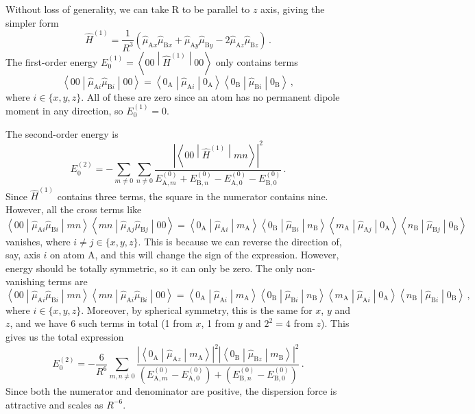 \documentclass{article}
\theoremstyle{plain}\theoremheaderfont{\normalfont\itshape}\theorembodyfont{\rmfamily}\theoremseparator{.}\newtheorem*{rem}{Remark}\newtheorem*{ex}{Example}\newtheorem*{proof}{Proof}\newtheorem*{altp}{Alternative proof}
\theoremstyle{plain}\theoremheaderfont{\normalfont\bfseries}\theorembodyfont{\rmfamily}\theoremseparator{.}\newtheorem{thm}{Theorem}[section]\newtheorem{lem}[thm]{Lemma}\newtheorem{prop}[thm]{Proposition}\newtheorem*{cor}{Corollary}\newtheorem{defn}[thm]{Definition}\newtheorem{clm}[thm]{Claim}\newtheorem{clminproof}{Claim}
\theoremstyle{break}\theoremheaderfont{\normalfont\itshape}\theorembodyfont{\rmfamily}\theoremseparator{.\medskip}\newtheorem*{proofskip}{Proof}\newtheorem*{exs}{Examples}\newtheorem*{rems}{Remarks}
\theoremstyle{break}\theoremheaderfont{\normalfont\bfseries}\theorembodyfont{\rmfamily}\theoremseparator{.\medskip}\newtheorem{lemskip}[thm]{Lemma}\newtheorem{defnskip}[thm]{Definition}\newtheorem{propskip}[thm]{Proposition}\newtheorem{thmskip}[thm]{Theorem}
\numberwithin{equation}{section}
\newcommand{\mel}[3]{\left\langle #1 \middle| #2 \middle| #3 \right\rangle}
\newcommand{\expval}[2]{\left\langle #2 \middle| #1 \middle| #2 \right\rangle}
\newcommand{\vb}[1]{\bm{\mathrm{#1}}}
\newcommand{\abs}[1]{\left| #1 \right|}
\renewcommand{\AA}{\mathrm{A}}
\newcommand{\BB}{\mathrm{B}}
\begin{document}
    Without loss of generality, we can take \(\vb{R}\) to be parallel to \(z\) axis, giving the simpler form
    \begin{equation}
        \hat{H}^{(1)}=\frac{1}{R^3}(\hat{\mu}_{\AA x}\hat{\mu}_{\BB x}+\hat{\mu}_{\AA y}\hat{\mu}_{\BB y}-2\hat{\mu}_{\AA z}\hat{\mu}_{\BB z})\,.
    \end{equation}
    The first-order energy \(E_0^{(1)}=\expval{\hat{H}^{(1)}}{00}\) only contains terms
    \begin{equation}
        \expval{\hat{\mu}_{\AA i}\hat{\mu}_{\BB i}}{00}=\expval{\hat{\mu}_{\AA i}}{0_{\AA}}\expval{\hat{\mu}_{\BB i}}{0_{\BB}}\,,
    \end{equation}
    where \(i\in\{x,y,z\}\). All of these are zero since an atom has no permanent dipole moment in any direction, so \(E_0^{(1)}=0\).

    The second-order energy is
    \begin{equation}\label{dispersion_RS_sum}
        E_0^{(2)}=-\sum_{m\ne 0}\sum_{n\ne 0}\frac{\abs{\mel{00}{\hat{H}^{(1)}}{mn}}^2}{E_{\AA,m}^{(0)}+E_{\BB,n}^{(0)}-E_{\AA,0}^{(0)}-E_{\BB,0}^{(0)}}\,.
    \end{equation}
    Since \(\hat{H}^{(1)}\) contains three terms, the square in the numerator contains nine. However, all the cross terms like
    \begin{equation}
        \mel{00}{\hat{\mu}_{\AA i}\hat{\mu}_{\BB i}}{mn}\mel{mn}{\hat{\mu}_{\AA j}\hat{\mu}_{\BB j}}{00}=\mel{0_{\AA}}{\hat{\mu}_{\AA i}}{m_{\AA}}\mel{0_{\BB}}{\hat{\mu}_{\BB i}}{n_{\BB}}\mel{m_{\AA}}{\hat{\mu}_{\AA j}}{0_{\AA}}\mel{n_{\BB}}{\hat{\mu}_{\BB j}}{0_{\BB}}
    \end{equation}
    vanishes, where \(i\ne j\in\{x,y,z\}\). This is because we can reverse the direction of, say, axis \(i\) on atom \(\AA\), and this will change the sign of the expression. However, energy should be totally symmetric, so it can only be zero. The only non-vanishing terms are
    \begin{equation}
        \mel{00}{\hat{\mu}_{\AA i}\hat{\mu}_{\BB i}}{mn}\mel{mn}{\hat{\mu}_{\AA i}\hat{\mu}_{\BB i}}{00}=\mel{0_{\AA}}{\hat{\mu}_{\AA i}}{m_{\AA}}\mel{0_{\BB}}{\hat{\mu}_{\BB i}}{n_{\BB}}\mel{m_{\AA}}{\hat{\mu}_{\AA i}}{0_{\AA}}\mel{n_{\BB}}{\hat{\mu}_{\BB i}}{0_{\BB}}\,,
    \end{equation}
    where \(i\in\{x,y,z\}\). Moreover, by spherical symmetry, this is the same for \(x\), \(y\) and \(z\), and we have 6 such terms in total (1 from \(x\), 1 from \(y\) and \(2^2=4\) from \(z\)). This gives us the total expression
    \begin{equation}\label{dispersion_force}
        E_0^{(2)}=-\frac{6}{R^6}\sum_{m,n\ne 0}\frac{\abs{\mel{0_{\AA}}{\hat{\mu}_{\AA z}}{m_{\AA}}}^2\abs{\mel{0_{\BB}}{\hat{\mu}_{\BB z}}{m_{\BB}}}^2}{(E_{\AA,m}^{(0)}-E_{\AA,0}^{(0)})+(E_{\BB,n}^{(0)}-E_{\BB,0}^{(0)})}\,.
    \end{equation}
    Since both the numerator and denominator are positive, the dispersion force is attractive and scales as \(R^{-6}\).
\end{document}
